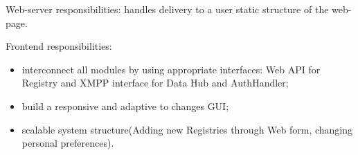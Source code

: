   Web-server responsibilities: handles delivery to a user static structure of the web-page.

  Frontend responsibilities:
  \begin{itemize}
  \item interconnect all modules by using appropriate interfaces: Web API for Registry and XMPP interface for Data Hub and AuthHandler;
  \item build a responsive and adaptive to changes GUI;
  \item scalable system structure(Adding new Registries through Web form, changing personal preferences).
  \end{itemize}